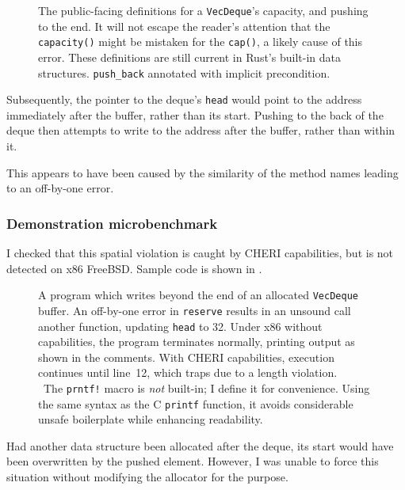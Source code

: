 \documentclass[dissertation.tex]{subfiles}
\begin{document}
\begin{figure}[ht]
    
    \caption{
        The public-facing definitions for a \texttt{VecDeque}'s
        capacity, and pushing to the end.
        It will not escape the reader's attention that the
        \texttt{capacity()} might be mistaken for the \texttt{cap()}, a
        likely cause of this error.
        These definitions are still current in Rust's built-in data
        structures.
        \texttt{push\_back} annotated with implicit precondition.
    }
    \label{lst:deque-defs}
\end{figure}

Subsequently, the pointer to the deque's \texttt{head} would point to
the address immediately after the buffer, rather than its start.
Pushing to the back of the deque then attempts to write to the address
after the buffer, rather than within it.

This appears to have been caused by the similarity of the method names
leading to an off-by-one error.

\subsubsection{Demonstration microbenchmark}
I checked that this spatial violation is caught by CHERI capabilities,
but is not detected on x86 FreeBSD.
Sample code is shown in .

\begin{figure}[ht]
    
    \caption{
        A program which writes beyond the end of an allocated
        \texttt{VecDeque} buffer.
        An off-by-one error in \texttt{reserve} results in an unsound
        call another function, updating \texttt{head} to 32.
        Under x86 without capabilities, the program terminates normally,
        printing output as shown in the
        comments.{\protect\textsuperscript\textdagger}
        With CHERI capabilities, execution continues until line~12, which
        traps due to a length violation.
        \\ {\footnotesize \protect\textdagger\ The \texttt{prntf!} macro
        is \emph{not} built-in; I define it for convenience. Using the
        same syntax as the C \texttt{printf} function, it avoids
        considerable unsafe boilerplate while enhancing readability.}
    }
    \label{lst:micro-capacity}
\end{figure}

Had another data structure been allocated after the deque, its start
would have been overwritten by the pushed element.
However, I was unable to force this situation without modifying the
allocator for the purpose.
\end{document}
